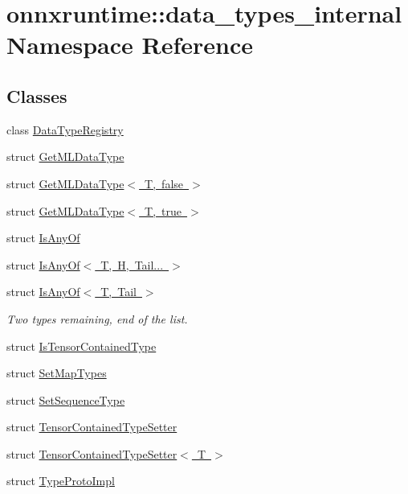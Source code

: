 \hypertarget{namespaceonnxruntime_1_1data__types__internal}{}\section{onnxruntime\+:\+:data\+\_\+types\+\_\+internal Namespace Reference}
\label{namespaceonnxruntime_1_1data__types__internal}
\subsection*{Classes}
\begin{DoxyCompactItemize}
\item 
class \mbox{\hyperlink{classonnxruntime_1_1data__types__internal_1_1DataTypeRegistry}{Data\+Type\+Registry}}
\item 
struct \mbox{\hyperlink{structonnxruntime_1_1data__types__internal_1_1GetMLDataType}{Get\+M\+L\+Data\+Type}}
\item 
struct \mbox{\hyperlink{structonnxruntime_1_1data__types__internal_1_1GetMLDataType_3_01T_00_01false_01_4}{Get\+M\+L\+Data\+Type$<$ T, false $>$}}
\item 
struct \mbox{\hyperlink{structonnxruntime_1_1data__types__internal_1_1GetMLDataType_3_01T_00_01true_01_4}{Get\+M\+L\+Data\+Type$<$ T, true $>$}}
\item 
struct \mbox{\hyperlink{structonnxruntime_1_1data__types__internal_1_1IsAnyOf}{Is\+Any\+Of}}
\item 
struct \mbox{\hyperlink{structonnxruntime_1_1data__types__internal_1_1IsAnyOf_3_01T_00_01H_00_01Tail_8_8_8_01_4}{Is\+Any\+Of$<$ T, H, Tail... $>$}}
\item 
struct \mbox{\hyperlink{structonnxruntime_1_1data__types__internal_1_1IsAnyOf_3_01T_00_01Tail_01_4}{Is\+Any\+Of$<$ T, Tail $>$}}
\begin{DoxyCompactList}\small\item\em Two types remaining, end of the list. \end{DoxyCompactList}\item 
struct \mbox{\hyperlink{structonnxruntime_1_1data__types__internal_1_1IsTensorContainedType}{Is\+Tensor\+Contained\+Type}}
\item 
struct \mbox{\hyperlink{structonnxruntime_1_1data__types__internal_1_1SetMapTypes}{Set\+Map\+Types}}
\item 
struct \mbox{\hyperlink{structonnxruntime_1_1data__types__internal_1_1SetSequenceType}{Set\+Sequence\+Type}}
\item 
struct \mbox{\hyperlink{structonnxruntime_1_1data__types__internal_1_1TensorContainedTypeSetter}{Tensor\+Contained\+Type\+Setter}}
\item 
struct \mbox{\hyperlink{structonnxruntime_1_1data__types__internal_1_1TensorContainedTypeSetter_3_01T_01_4}{Tensor\+Contained\+Type\+Setter$<$ T $>$}}
\item 
struct \mbox{\hyperlink{structonnxruntime_1_1data__types__internal_1_1TypeProtoImpl}{Type\+Proto\+Impl}}
\end{DoxyCompactItemize}

